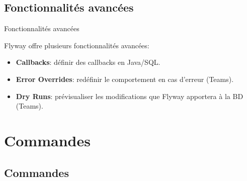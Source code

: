 \documentclass[slidestop,compress,11pt,xcolor=dvipsnames,french]{beamer}
\begin{document}
\subsection*{Fonctionnalités avancées}
\begin{frame}{Fonctionnalités avancées}

Flyway offre plusieurs fonctionnalités avancées: \\
 \begin{itemize}
  \item \textbf{Callbacks}: définir des callbacks en Java/SQL.
  \item \textbf{Error Overrides}: redéfinir le comportement en cas d'erreur (Teams).
  \item \textbf{Dry Runs}: prévisualiser les modifications que Flyway apportera à la BD (Teams).
 \end{itemize}
\end{frame}

\section{Commandes}
\subsection*{Commandes}
\end{document}
